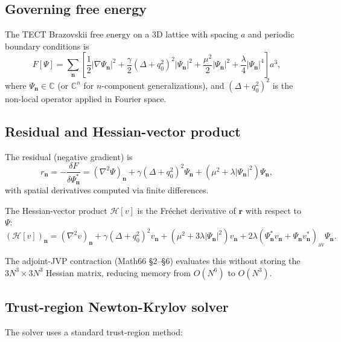 \subsection{Governing free energy}

The TECT Brazovskii free energy on a 3D lattice with spacing $a$ and
periodic boundary conditions is
\begin{equation}
F[\Psi] = \sum_{\mathbf{n}} \left[\frac{1}{2}|\nabla\Psi_{\mathbf{n}}|^2
+ \frac{\gamma}{2}(\Delta + q_0^2)^2|\Psi_{\mathbf{n}}|^2
+ \frac{\mu^2}{2}|\Psi_{\mathbf{n}}|^2 + \frac{\lambda}{4}|\Psi_{\mathbf{n}}|^4\right]\!a^3,
\label{eq:F_lattice}
\end{equation}
where $\Psi_{\mathbf{n}} \in \mathbb{C}$ (or $\mathbb{C}^n$ for $n$-component
generalizations), and $(\Delta + q_0^2)^2$ is the non-local operator
applied in Fourier space.

\subsection{Residual and Hessian-vector product}

The residual (negative gradient) is
\begin{equation}
r_{\mathbf{n}} = -\frac{\delta F}{\delta \Psi_{\mathbf{n}}^*}
= (\nabla^2 \Psi)_{\mathbf{n}} + \gamma(\Delta + q_0^2)^2\Psi_{\mathbf{n}}
+ (\mu^2 + \lambda|\Psi_{\mathbf{n}}|^2)\Psi_{\mathbf{n}},
\end{equation}
with spatial derivatives computed via finite differences.

The Hessian-vector product $\mathcal{H}[v]$ is the Fréchet derivative
of $\mathbf{r}$ with respect to $\Psi$:
\begin{equation}
(\mathcal{H}[v])_{\mathbf{n}} = (\nabla^2 v)_{\mathbf{n}}
+ \gamma(\Delta + q_0^2)^2 v_{\mathbf{n}}
+ (\mu^2 + 3\lambda|\Psi_{\mathbf{n}}|^2)v_{\mathbf{n}}
+ 2\lambda(\Psi_{\mathbf{n}}^* v_{\mathbf{n}} + \Psi_{\mathbf{n}} v_{\mathbf{n}}^*)_{\text{av}}\Psi_{\mathbf{n}}.
\end{equation}

The adjoint-JVP contraction (Math66 §2–§6) evaluates this without
storing the $3N^3 \times 3N^3$ Hessian matrix, reducing memory from
$O(N^6)$ to $O(N^3)$.

\subsection{Trust-region Newton-Krylov solver}

The solver uses a standard trust-region method:

